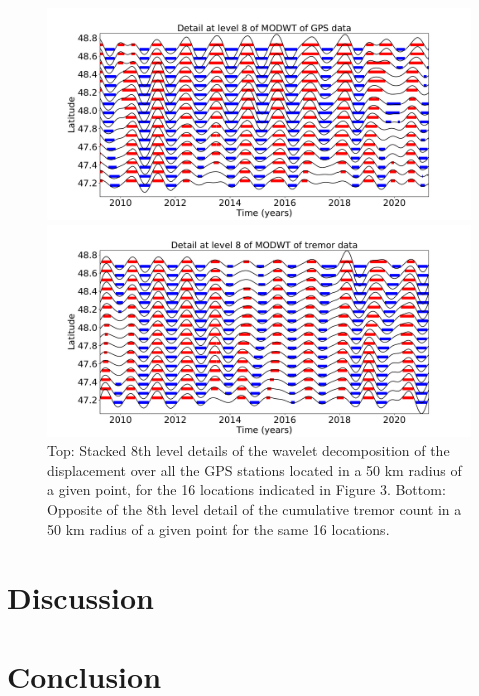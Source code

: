 \documentclass[draft]{agujournal2018}
\begin{document}
\begin{figure}
\noindent\includegraphics[width=\textwidth, trim={0cm 0cm 0cm 0cm},clip]{figures/GPS_detail_8.pdf}

\noindent\includegraphics[width=\textwidth, trim={0cm 0cm 0cm 0cm},clip]{figures/tremor_detail_8.pdf}
\caption{Top: Stacked 8th level details of the wavelet decomposition of the displacement over all the GPS stations located in a 50 km radius of a given point, for the 16 locations indicated in Figure 3. Bottom: Opposite of the 8th level detail of the cumulative tremor count in a 50 km radius of a given point for the same 16 locations.}
\label{pngfiguresample}
\end{figure}

\section{Discussion}

\section{Conclusion}


\end{document}
